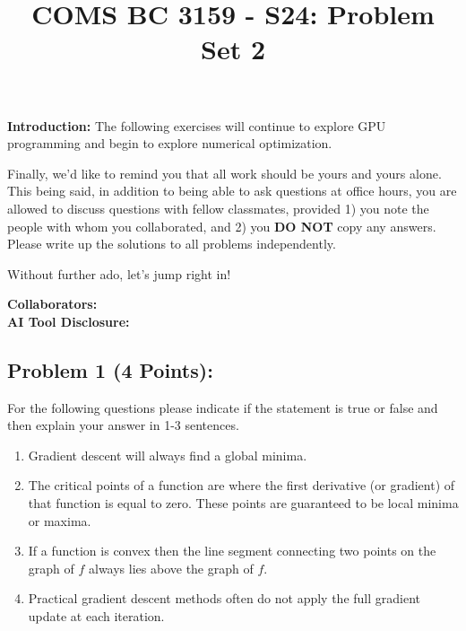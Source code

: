 \documentclass[]{article}
\title{COMS BC 3159 - S24: Problem Set 2}
\author{
}
\date{}
\begin{document}
\maketitle

\textbf{Introduction:}  
The following exercises will continue to explore GPU programming and begin to explore numerical optimization.

Finally, we'd like to remind you that all work should be yours and yours alone. This being said, in addition to being able to ask questions at office hours, you are allowed to discuss questions with fellow classmates, provided 1) you note the people with whom you collaborated, and 2) you \textbf{DO NOT} copy any answers. Please write up the solutions to all problems independently.

Without further ado, let's jump right in!

\bigskip
\textbf{Collaborators:}
\\
\textbf{AI Tool Disclosure:}
\clearpage

\subsection*{Problem 1 (4 Points):}
For the following questions please indicate if the statement is true or false and then explain your answer in 1-3 sentences.
\begin{enumerate}[label=(\alph*)]
    \item Gradient descent will always find a global minima.
    \item The critical points of a function are where the first derivative (or gradient) of that function is equal to zero. These points are guaranteed to be local minima or maxima.
    \item If a function is convex then the line segment connecting two points on the graph of $f$ always lies above the graph of $f$.
    \item Practical gradient descent methods often do not apply the full gradient update at each iteration.
\end{enumerate}
\end{document}
